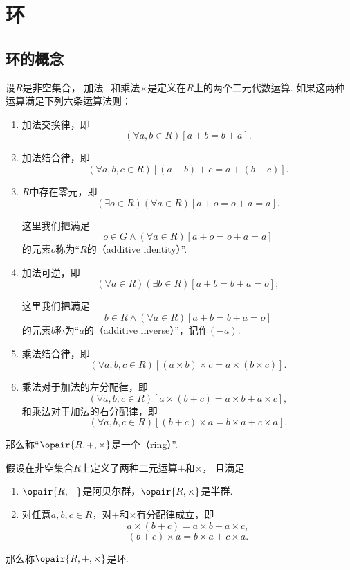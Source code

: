 \section{环}
\subsection{环的概念}
\begin{definition}\label{definition:抽象代数.环的定义}
设\(R\)是非空集合，
加法\(+\)和乘法\(\times\)是定义在\(R\)上的两个二元代数运算.
如果这两种运算满足下列六条运算法则：
\begin{enumerate}
    \item 加法交换律，即\[
        (\forall a,b \in R)[a+b = b+a].
    \]

    \item 加法结合律，即\[
        (\forall a,b,c \in R)[(a+b)+c = a+(b+c)].
    \]

    \item \(R\)中存在零元，即\[
        (\exists o \in R)(\forall a \in R)[a+o = o+a = a].
    \]

	这里我们把满足\[
		o \in G
		\land
		(\forall a \in R)[a+o = o+a = a]
	\]的元素\(o\)称为“\(R\)的（additive identity）”.

    \item 加法可逆，即\[
        (\forall a \in R)(\exists b \in R)[a+b = b+a = o];
    \]

	这里我们把满足\[
		b \in R
		\land
        (\forall a \in R)[a+b = b+a = o]
	\]的元素\(b\)称为“\(a\)的（additive inverse）”，记作\((-a)\).

    \item 乘法结合律，即\[
        (\forall a,b,c \in R)
        [ (a \times b) \times c = a \times (b \times c) ].
    \]

    \item 乘法对于加法的左分配律，即\[
        (\forall a,b,c \in R)[ a \times (b+c) = a \times b + a \times c ],
    \]
    和乘法对于加法的右分配律，即\[
        (\forall a,b,c \in R)[ (b+c) \times a = b \times a + c \times a ].
    \]
\end{enumerate}
那么称“\(\opair{R,+,\times}\)是一个（ring）”.
\end{definition}

\begin{theorem}
假设在非空集合\(R\)上定义了两种二元运算\(+\)和\(\times\)，
且满足\begin{enumerate}
    \item \(\opair{R,+}\)是阿贝尔群，\(\opair{R,\times}\)是半群.

    \item 对任意\(a,b,c \in R\)，对\(+\)和\(\times\)有分配律成立，即\[
        a \times (b + c) = a \times b + a \times c,
    \]\[
        (b + c) \times a = b \times a + c \times a.
    \]
\end{enumerate}
那么称\(\opair{R,+,\times}\)是环.
\end{theorem}


